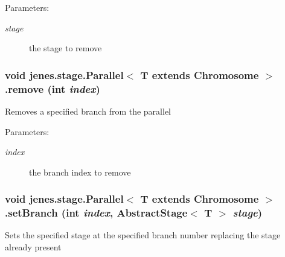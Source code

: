 \begin{Desc}
\item[Parameters:]
\begin{description}
\item[{\em stage}]the stage to remove \end{description}
\end{Desc}
\hypertarget{classjenes_1_1stage_1_1_parallel_3_01_t_01extends_01_chromosome_01_4_cf777ee17edc34cb81d2d0fc145cffc4}{
\subsubsection[remove]{\setlength{\rightskip}{0pt plus 5cm}void jenes.stage.Parallel$<$ T extends Chromosome $>$.remove (int {\em index})}}
\label{classjenes_1_1stage_1_1_parallel_3_01_t_01extends_01_chromosome_01_4_cf777ee17edc34cb81d2d0fc145cffc4}


Removes a specified branch from the parallel 

\begin{Desc}
\item[Parameters:]
\begin{description}
\item[{\em index}]the branch index to remove \end{description}
\end{Desc}
\hypertarget{classjenes_1_1stage_1_1_parallel_3_01_t_01extends_01_chromosome_01_4_115d20da27789c0a053ed7e161838477}{
\subsubsection[setBranch]{\setlength{\rightskip}{0pt plus 5cm}void jenes.stage.Parallel$<$ T extends Chromosome $>$.setBranch (int {\em index}, \/  AbstractStage$<$ T $>$ {\em stage})}}
\label{classjenes_1_1stage_1_1_parallel_3_01_t_01extends_01_chromosome_01_4_115d20da27789c0a053ed7e161838477}


Sets the specified stage at the specified branch number replacing the stage already present 

